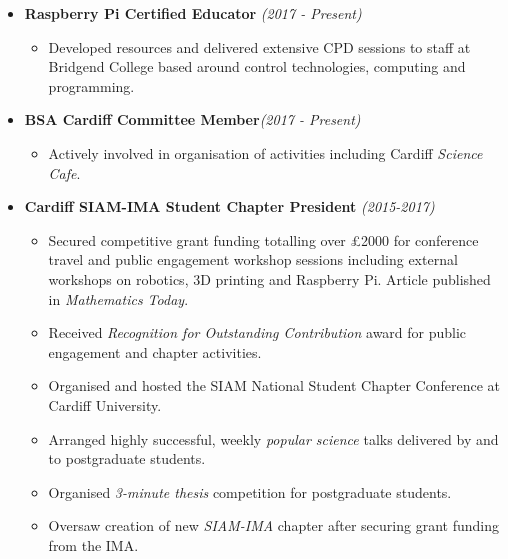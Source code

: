 \documentclass[10pt,a4paper,sans]{moderncv}        %
\begin{document}
\begin{itemize}
		\vspace{4pt}
		
		\item{ \textbf{Raspberry Pi Certified Educator} \hfill\textit{(2017 - Present)}
			
			\vspace{4pt}
			
			\small{
				\begin{itemize}	
					\item Developed resources and delivered extensive CPD sessions to staff at Bridgend College based around control technologies, computing and programming.
				\end{itemize}
		} }
		
		\vspace{4pt}
		
		\item{\textbf{BSA Cardiff Committee Member}\hfill \textit{(2017 - Present)}
			
			\vspace{4pt}
			
			\small{
				\begin{itemize}	
					\item Actively involved in organisation of activities including Cardiff \textit{Science Cafe}.
				\end{itemize}
		}}
		
		\vspace{4pt}
		
		\item{\textbf{Cardiff SIAM-IMA Student Chapter President} \hfill\textit{(2015-2017)}
			
			\vspace{4pt}
			
			\small{
				\begin{itemize}	
					\item Secured competitive grant funding totalling over £2000 for conference travel and public engagement workshop sessions including external workshops on robotics, 3D printing and Raspberry Pi. Article published in \textit{Mathematics Today}.
					\vspace{3pt}
					\item Received \textit{Recognition for Outstanding Contribution} award for public engagement and chapter activities.
					\vspace{3pt}
					\item Organised and hosted the SIAM National Student Chapter Conference at Cardiff University.
					\vspace{3pt}
					\item Arranged highly successful, weekly \textit{popular science} talks delivered by and to postgraduate students.
					\vspace{3pt}
					\item Organised \textit{3-minute thesis} competition for postgraduate students.	
					\vspace{3pt}
					\item Oversaw creation of new \textit{SIAM-IMA} chapter after securing grant funding from the IMA.
				\end{itemize}
		}}
		
	\end{itemize}
	
\end{document}
